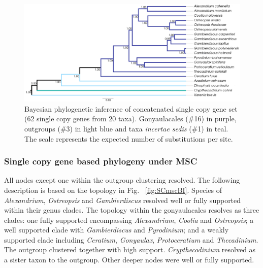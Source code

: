 \documentclass[fleqn,10pt,lineno]{wlpeerj} %
\begin{document}
\begin{figure}[ht] 
\centering
\includegraphics[width=\linewidth]{gonya-figs/SC-concat-BI.png} 
\caption{Bayesian phylogenetic inference of concatenated single copy gene set (62 single copy genes from 20 taxa). Gonyaulacales (\#16) in purple, outgroups (\#3) in light blue and taxa \textit{incertae sedis} (\#1) in teal. The scale represents the expected number of substitutions per site.} 
\label{fig:SCconcatBI}
\end{figure} 

\subsubsection*{Single copy gene based phylogeny under MSC}
All nodes except one within the outgroup clustering resolved.
The following description is based on the topology in Fig. ~\ref{fig:SCmscBI}. 
Species of \emph{Alexandrium}, \emph{Ostreopsis} and \emph{Gambierdiscus} resolved well or fully supported within their genus clades. 
The topology within the gonyaulacales resolves as three clades: 
one fully supported encompassing \emph{Alexandrium}, \emph{Coolia} and \emph{Ostreopsis};
a well supported clade with \emph{Gambierdiscus} and \emph{Pyrodinium}; 
and a weakly supported clade including \emph{Ceratium}, \emph{Gonyaulax}, \emph{Protoceratium} and \emph{Thecadinium}. 
The outgroup clustered together with high support. 
\emph{Crypthecodinium} resolved as a sister taxon to the outgroup. 
Other deeper nodes were well or fully supported.
\end{document}

